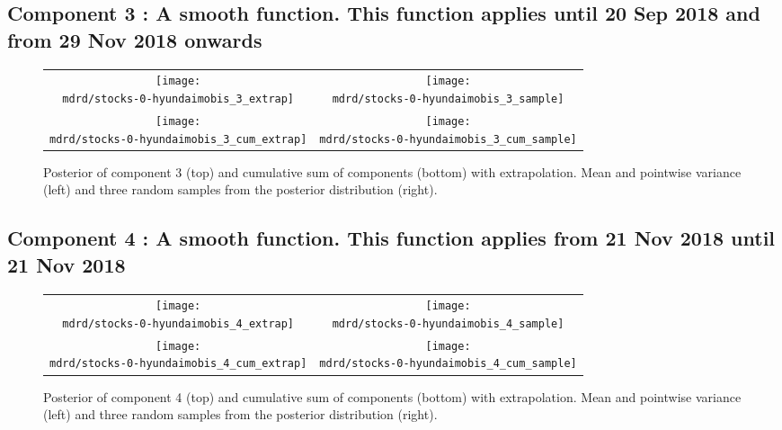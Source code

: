 \documentclass{article} %
\begin{document}
\subsection{Component 3 : A smooth function. This function applies until 20 Sep 2018 and from 29 Nov 2018 onwards}



\begin{figure}[H]
\newcommand{\wmgd}{0.5\columnwidth}
\newcommand{\hmgd}{3.0cm}
\newcommand{\mdrd}{stocks-0-hyundaimobis}
\newcommand{\mbm}{\hspace{-0.3cm}}
\begin{tabular}{cc}
\mbm \texttt{[image: \\mdrd/stocks-0-hyundaimobis\_3\_extrap]} & \texttt{[image: \\mdrd/stocks-0-hyundaimobis\_3\_sample]} \\
\mbm \texttt{[image: \\mdrd/stocks-0-hyundaimobis\_3\_cum\_extrap]} & \texttt{[image: \\mdrd/stocks-0-hyundaimobis\_3\_cum\_sample]}
\end{tabular}
\caption{Posterior of component 3 (top) and cumulative sum of components (bottom) with extrapolation. Mean and pointwise variance (left) and three random samples from the posterior distribution (right).}
\label{fig:extrap3}
\end{figure}

\subsection{Component 4 : A smooth function. This function applies from 21 Nov 2018 until 21 Nov 2018}



\begin{figure}[H]
\newcommand{\wmgd}{0.5\columnwidth}
\newcommand{\hmgd}{3.0cm}
\newcommand{\mdrd}{stocks-0-hyundaimobis}
\newcommand{\mbm}{\hspace{-0.3cm}}
\begin{tabular}{cc}
\mbm \texttt{[image: \\mdrd/stocks-0-hyundaimobis\_4\_extrap]} & \texttt{[image: \\mdrd/stocks-0-hyundaimobis\_4\_sample]} \\
\mbm \texttt{[image: \\mdrd/stocks-0-hyundaimobis\_4\_cum\_extrap]} & \texttt{[image: \\mdrd/stocks-0-hyundaimobis\_4\_cum\_sample]}
\end{tabular}
\caption{Posterior of component 4 (top) and cumulative sum of components (bottom) with extrapolation. Mean and pointwise variance (left) and three random samples from the posterior distribution (right).}
\label{fig:extrap4}
\end{figure}
\end{document}
